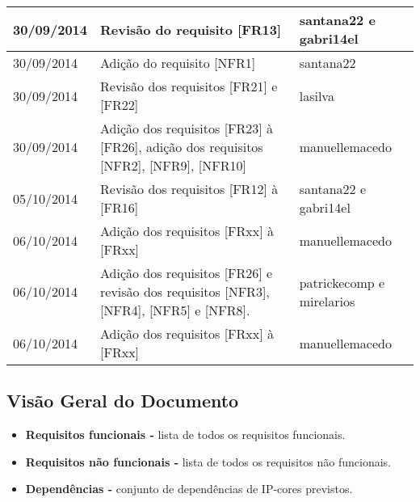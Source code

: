 \documentclass{article}
\begin{document}
\begin{table}[ht]
\begin{tabular}[pos]{|m{2cm} | m{7.2cm} | m{3.8cm}|}
\small 30/09/2014 & \small Revisão do requisito [FR13] & \small santana22 e gabri14el \\ \hline

\small 30/09/2014 & \small Adição do requisito [NFR1] & \small santana22 \\ \hline

\small 30/09/2014 & \small Revisão dos requisitos [FR21] e [FR22] & \small lasilva\\ \hline

\small 30/09/2014 & \small Adição dos requisitos [FR23] à [FR26], adição dos requisitos [NFR2], [NFR9], [NFR10]  & \small manuellemacedo \\ \hline

\small 05/10/2014 & \small Revisão dos requisitos [FR12] à [FR16] & \small santana22 e gabri14el \\ \hline

\small 06/10/2014 & \small Adição dos requisitos [FRxx] à [FRxx] & \small manuellemacedo \\ \hline %

\small 06/10/2014 & \small Adição dos requisitos [FR26] e revisão dos requisitos [NFR3], [NFR4], [NFR5] e [NFR8].  & \small patrickecomp e mirelarios \\ \hline

\small 06/10/2014 & \small Adição dos requisitos [FRxx] à [FRxx] & \small manuellemacedo \\ \hline %
		      
		\end{tabular}
	\end{table}
		
\newpage
		
\tableofcontents
\newpage
		
    
		
	\subsection{Visão Geral do Documento}
		\begin{itemize}
			\item \textbf{Requisitos funcionais -} lista de todos os requisitos funcionais.
			\item \textbf{Requisitos não funcionais -} lista de todos os requisitos não funcionais.
			\item \textbf{Dependências -} conjunto de dependências de IP-cores previstos.
		\end{itemize}
		
\end{document}
